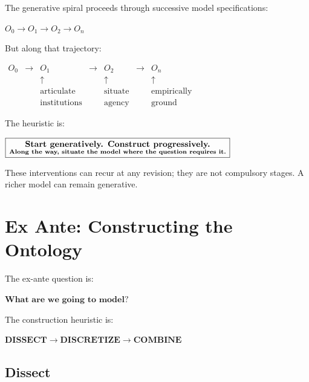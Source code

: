 \documentclass[11pt,a4paper]{article}
\newenvironment{fitdisplay}{\par\medskip\noindent\begin{lrbox}{\displaybox}$\displaystyle}{%
$\end{lrbox}\makebox[\linewidth][c]{\ifdim\wd\displaybox>\linewidth\resizebox{\linewidth}{!}{\usebox{\displaybox}}\else\usebox{\displaybox}\fi}\par\medskip}
\begin{document}
The generative spiral proceeds through successive model specifications:

\begin{fitdisplay}
\boxed{
O_0
\longrightarrow
O_1
\longrightarrow
O_2
\longrightarrow
O_n
}
\end{fitdisplay}

But along that trajectory:

\begin{fitdisplay}
\boxed{
\begin{array}{ccccccc}
O_0 &\longrightarrow& O_1 &\longrightarrow& O_2 &\longrightarrow& O_n\\
&&\uparrow&&\uparrow&&\uparrow\\
&&\text{articulate}&&\text{situate}&&\text{empirically}\\
&&\text{institutions}&&\text{agency}&&\text{ground}
\end{array}}
\end{fitdisplay}

The heuristic is:

\begin{fitdisplay}
\boxed{
\textbf{Start generatively. Construct progressively.}
\atop
\textbf{Along the way, situate the model where the question requires it.}
}
\end{fitdisplay}

These interventions can recur at any revision; they are not compulsory stages. A richer model can remain generative.



\clearpage
\section{Ex Ante: Constructing the Ontology}

The ex-ante question is:

\begin{fitdisplay}
\boxed{\textbf{What are we going to model?}}
\end{fitdisplay}

The construction heuristic is:

\begin{fitdisplay}
\boxed{
\textbf{DISSECT}
\rightarrow
\textbf{DISCRETIZE}
\rightarrow
\textbf{COMBINE}
}
\end{fitdisplay}



\subsection{Dissect}
\end{document}
